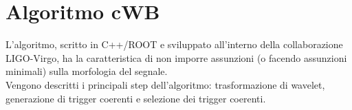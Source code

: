 \section{Algoritmo cWB}
L'algoritmo, scritto in C++/ROOT e sviluppato all'interno della collaborazione LIGO-Virgo, ha la caratteristica di non imporre assunzioni (o facendo assunzioni minimali) sulla morfologia del segnale.\\
Vengono descritti i principali step dell'algoritmo: trasformazione di wavelet, generazione di trigger coerenti e selezione dei trigger coerenti.
